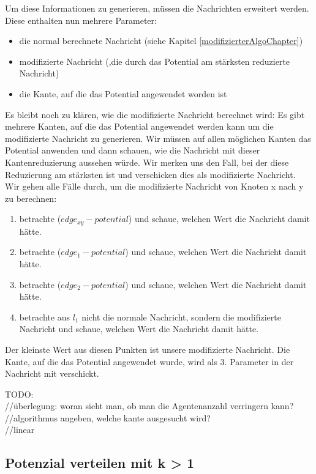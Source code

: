 	Um diese Informationen zu generieren, müssen die Nachrichten erweitert werden.
	Diese enthalten nun mehrere Parameter:
	\begin{itemize}
		\item die normal berechnete Nachricht (siehe Kapitel \ref{modifizierterAlgoChapter})
		\item modifizierte Nachricht (,die durch das Potential am stärksten reduzierte Nachricht)
		\item die Kante, auf die das Potential angewendet worden ist
	\end{itemize}
	Es bleibt noch zu klären, wie die modifizierte Nachricht berechnet wird:
	Es gibt mehrere Kanten, auf die das Potential angewendet werden kann um die modifizierte Nachricht zu generieren. Wir müssen auf allen möglichen Kanten das Potential anwenden und dann schauen, wie die Nachricht mit dieser Kantenreduzierung aussehen würde. Wir merken uns den Fall, bei der diese Reduzierung am stärksten ist und verschicken dies als modifizierte Nachricht. 
	\\
	Wir gehen alle Fälle durch, um die modifizierte Nachricht von Knoten x nach y zu berechnen:
	\begin{enumerate}
		\item betrachte ($edge_{xy} - potential$) und schaue, welchen Wert die Nachricht damit hätte.
		\item betrachte ($edge_{1} - potential$) und schaue, welchen Wert die Nachricht damit hätte.
		\item betrachte ($edge_{2} - potential$) und schaue, welchen Wert die Nachricht damit hätte.
		\item betrachte aus $l_{1}$ nicht die normale Nachricht, sondern die modifizierte Nachricht und schaue, welchen Wert die Nachricht damit hätte.
	\end{enumerate}
	Der kleinste Wert aus diesen Punkten ist unsere modifizierte Nachricht. Die Kante, auf die das Potential angewendet wurde, wird als 3. Parameter in der Nachricht mit verschickt.
	

TODO:\\
//überlegung: woran sieht man, ob man die Agentenanzahl verringern kann?\\
//algorithmus angeben, welche kante ausgesucht wird?\\
//linear

\subsection{Potenzial verteilen mit k > 1}